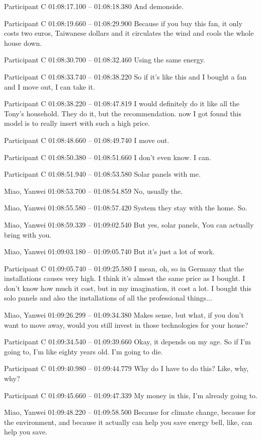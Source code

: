 {Participant C 01:08:17.100 -- 01:08:18.380
And demonside.

Participant C 01:08:19.660 -- 01:08:29.900
Because if you buy this fan, it only costs two euros, Taiwanese dollars and it circulates the wind and cools the whole house down.

Participant C 01:08:30.700 -- 01:08:32.460
Using the same energy.

Participant C 01:08:33.740 -- 01:08:38.220
So if it's like this and I bought a fan and I move out, I can take it.

Participant C 01:08:38.220 -- 01:08:47.819
I would definitely do it like all the Tony's household. They do it, but the recommendation. now I got found this model is to really insert with such a high price.

Participant C 01:08:48.660 -- 01:08:49.740
I move out.

Participant C 01:08:50.380 -- 01:08:51.660
I don't even know. I can.

Participant C 01:08:51.940 -- 01:08:53.580
Solar panels with me.

Miao, Yanwei 01:08:53.700 -- 01:08:54.859
No, usually the.

Miao, Yanwei 01:08:55.580 -- 01:08:57.420
System they stay with the home. So.

Miao, Yanwei 01:08:59.339 -- 01:09:02.540
But yes, solar panels, You can actually bring with you.

Miao, Yanwei 01:09:03.180 -- 01:09:05.740
But it's just a lot of work.

Participant C 01:09:05.740 -- 01:09:25.580
I mean, oh, so in Germany that the installations causes very high. I think it's almost the same price as I bought. I don't know how much it cost, but in my imagination, it cost a lot. I bought this solo panels and also the installations of all the professional things...

Miao, Yanwei 01:09:26.299 -- 01:09:34.380
Makes sense, but what, if you don't want to move away, would you still invest in those technologies for your house?

Participant C 01:09:34.540 -- 01:09:39.660
Okay, it depends on my age. So if I'm going to, I'm like eighty years old. I'm going to die.

Participant C 01:09:40.980 -- 01:09:44.779
Why do I have to do this? Like, why, why?

Participant C 01:09:45.660 -- 01:09:47.339
My money in this, I'm already going to.

Miao, Yanwei 01:09:48.220 -- 01:09:58.500
Because for climate change, because for the environment, and because it actually can help you save energy bell, like, can help you save.

}
